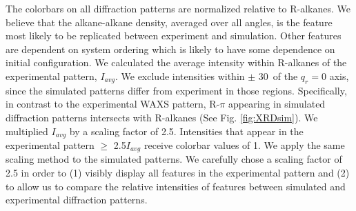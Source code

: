 \documentclass{article}
\newcommand{\angstrom}{\textup{\AA}}
\begin{document}
  The colorbars on all diffraction patterns are normalized relative to
  R-alkanes. We believe that the alkane-alkane density, averaged over all angles,
  is the feature most likely to be replicated between experiment and simulation.
  Other features are dependent on system ordering which is likely to have some
  dependence on initial configuration. We calculated the average intensity within
  R-alkanes of the experimental pattern, $I_{avg}$.  We exclude intensities
  within $\pm$ 30\degree~of the $q_r=0$ axis, since the simulated patterns differ
  from experiment in those regions.  Specifically, in contrast to the
  experimental WAXS pattern, R-$\pi$ appearing in simulated diffraction patterns
  intersects with R-alkanes (See Fig. \ref{fig:XRDsim}). We multiplied $I_{avg}$
  by a scaling factor of 2.5. Intensities that appear in the experimental pattern
  $\geq$ 2.5$I_{avg}$ receive colorbar values of 1. We apply the same scaling
  method to the simulated patterns. We carefully chose a scaling factor of 2.5 in
  order to (1) visibly display all features in the experimental pattern and (2)
  to allow us to compare the relative intensities of features between simulated
  and experimental diffraction patterns.

  
\end{document}
